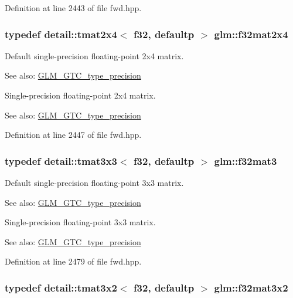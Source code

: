 Definition at line 2443 of file fwd.hpp.\hypertarget{group__gtc__type__precision_gba05bfeff59b12ea8e8ad2f6bfd8eece}{
\subsubsection[f32mat2x4]{\setlength{\rightskip}{0pt plus 5cm}typedef detail::tmat2x4$<$ f32, defaultp $>$ {\bf glm::f32mat2x4}}}
\label{group__gtc__type__precision_gba05bfeff59b12ea8e8ad2f6bfd8eece}


Default single-precision floating-point 2x4 matrix. \begin{Desc}
\item[See also:]\hyperlink{group__gtc__type__precision}{GLM\_\-GTC\_\-type\_\-precision}\end{Desc}
Single-precision floating-point 2x4 matrix. \begin{Desc}
\item[See also:]\hyperlink{group__gtc__type__precision}{GLM\_\-GTC\_\-type\_\-precision} \end{Desc}


Definition at line 2447 of file fwd.hpp.\hypertarget{group__gtc__type__precision_gf8d666dea6f652c21f0c1515ce522090}{
\subsubsection[f32mat3]{\setlength{\rightskip}{0pt plus 5cm}typedef detail::tmat3x3$<$ f32, defaultp $>$ {\bf glm::f32mat3}}}
\label{group__gtc__type__precision_gf8d666dea6f652c21f0c1515ce522090}


Default single-precision floating-point 3x3 matrix. \begin{Desc}
\item[See also:]\hyperlink{group__gtc__type__precision}{GLM\_\-GTC\_\-type\_\-precision}\end{Desc}
Single-precision floating-point 3x3 matrix. \begin{Desc}
\item[See also:]\hyperlink{group__gtc__type__precision}{GLM\_\-GTC\_\-type\_\-precision} \end{Desc}


Definition at line 2479 of file fwd.hpp.\hypertarget{group__gtc__type__precision_g43fa9ba1875db74cba2cea33321a77ff}{
\subsubsection[f32mat3x2]{\setlength{\rightskip}{0pt plus 5cm}typedef detail::tmat3x2$<$ f32, defaultp $>$ {\bf glm::f32mat3x2}}}
\label{group__gtc__type__precision_g43fa9ba1875db74cba2cea33321a77ff}


